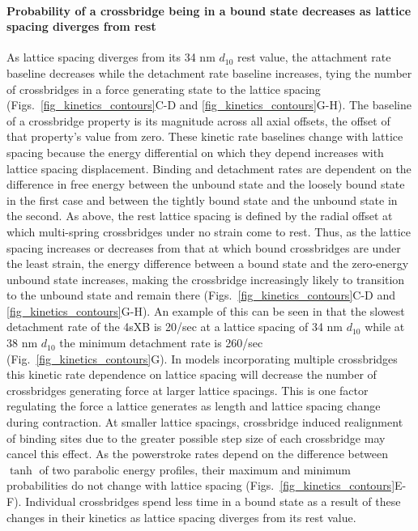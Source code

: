 \documentclass[]{article}
\begin{document}
\paragraph{Probability of a crossbridge being in a bound state decreases as lattice spacing diverges from rest} %
As lattice spacing diverges from its 34 nm $d_{10}$ rest value, the attachment rate baseline decreases while the detachment rate baseline increases, tying the number of crossbridges in a force generating state to the lattice spacing (Figs.~\ref{fig_kinetics_contours}C-D and \ref{fig_kinetics_contours}G-H). 
The baseline of a crossbridge property is its magnitude across all axial offsets, the offset of that property's value from zero. 
These kinetic rate baselines change with lattice spacing because the energy differential on which they depend increases with lattice spacing displacement.
Binding and detachment rates are dependent on the difference in free energy between the unbound state and the loosely bound state in the first case and between the tightly bound state and the unbound state in the second.
As above, the rest lattice spacing is defined by the radial offset at which multi-spring crossbridges under no strain come to rest. 
Thus, as the lattice spacing increases or decreases from that at which bound crossbridges are under the least strain, the energy difference between a bound state and the zero-energy unbound state increases, making the crossbridge increasingly likely to transition to the unbound state and remain there (Figs.~\ref{fig_kinetics_contours}C-D and  \ref{fig_kinetics_contours}G-H). 
An example of this can be seen in that the slowest detachment rate of the 4sXB is 20/sec at a lattice spacing of 34 nm $d_{10}$ while at 38 nm $d_{10}$ the minimum detachment rate is 260/sec (Fig.~\ref{fig_kinetics_contours}G).
In models incorporating multiple crossbridges this kinetic rate dependence on lattice spacing will decrease the number of crossbridges generating force at larger lattice spacings.
This is one factor regulating the force a lattice generates as length and lattice spacing change during contraction.
At smaller lattice spacings, crossbridge induced realignment of binding sites due to the greater possible step size of each crossbridge may cancel this effect.
As the powerstroke rates depend on the difference between $\tanh$ of two parabolic energy profiles, their maximum and minimum probabilities do not change with lattice spacing (Figs.~\ref{fig_kinetics_contours}E-F). 
Individual crossbridges spend less time in a bound state as a result of these changes in their kinetics as lattice spacing diverges from its rest value.
\end{document}
